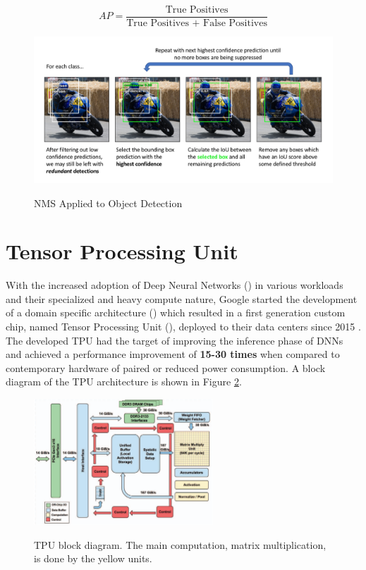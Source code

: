 \begin{equation}
	\label{eq:AP}
	AP = \frac{\text{True Positives}}{\text{True Positives + False Positives}}
\end{equation}


\begin{figure}[H]
	\centering
	\caption[NMS Applied to Object Detection]{NMS Applied to Object Detection}
    \includegraphics[width=1\textwidth]{./images/nms-object-detection.png }
	\label{fig:nmsObjectDetection}
\end{figure}

\section{Tensor Processing Unit}
\label{sec:TPU}

With the increased adoption of Deep Neural Networks () 
in various workloads and their specialized and heavy compute nature, Google started the 
development of a domain specific architecture () 
which resulted in a first generation custom chip, named Tensor Processing Unit 
(), deployed to their data centers since 2015 \cite{Google2015}.
The developed TPU had the target of improving the inference phase of DNNs and
achieved a performance improvement of \textbf{15-30 times} when compared to
contemporary hardware of paired or reduced power consumption. A block diagram of the TPU
architecture is shown in Figure \ref{fig:tpuarch}.

\begin{figure}[H]
	\centering
	\caption[TPU block diagram]{TPU block diagram. The main computation, matrix multiplication, is done by the yellow units.}
    \includegraphics[width=0.6\textwidth]{./images/tpublock.png}
	\label{fig:tpuarch}
\end{figure}

